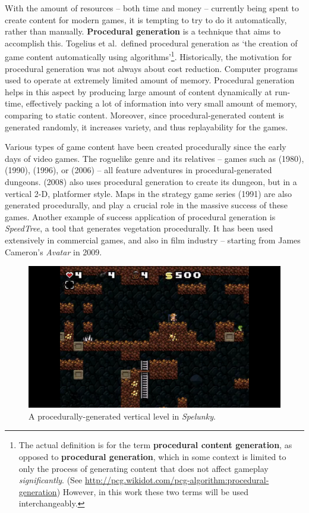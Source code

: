 With the amount of resources -- both time and money -- currently being spent to create content for modern games, it is tempting to try to do it automatically, rather than manually. \textbf{Procedural generation} is a technique that aims to accomplish this. Togelius et al.\cite{togelius2011procedural}\ defined procedural generation as `the creation of game content automatically using algorithms'\footnote{The actual definition is for the term \textbf{procedural content generation}, as opposed to \textbf{procedural generation}, which in some context is limited to only the process of generating content that does not affect gameplay \textit{significantly}. (See \url{http://pcg.wikidot.com/pcg-algorithm:procedural-generation}) However, in this work these two terms will be used interchangeably.}. Historically, the motivation for procedural generation was not always about cost reduction. Computer programs used to operate at extremely limited amount of memory. Procedural generation helps in this aspect by producing large amount of content dynamically at run-time, effectively packing a lot of information into very small amount of memory, comparing to static content. Moreover, since procedural-generated content is generated randomly, it increases variety, and thus replayability for the games. %

Various types of game content have been created procedurally since the early days of video games. The roguelike genre and its relatives -- games such as  (1980),  (1990),  (1996), or  (2006) -- all feature adventures in procedural-generated dungeons.  (2008) also uses procedural generation to create its dungeon, but in a vertical 2-D, platformer style. Maps in the strategy game series  (1991) are also generated procedurally, and play a crucial role in the massive success of these games\cite{web-7usesofprocgen}. Another example of success application of procedural generation is \textit{SpeedTree}, a tool that generates vegetation procedurally. It has been used extensively in commercial games, and also in film industry -- starting from James Cameron's \textit{Avatar} in 2009.\cite{web-speedtree}

\begin{figure}
	\centering
	\includegraphics[width=.7\linewidth]{figures/Spelunky.png}
	\caption{A procedurally-generated vertical level in \textit{Spelunky}.}
\end{figure}

